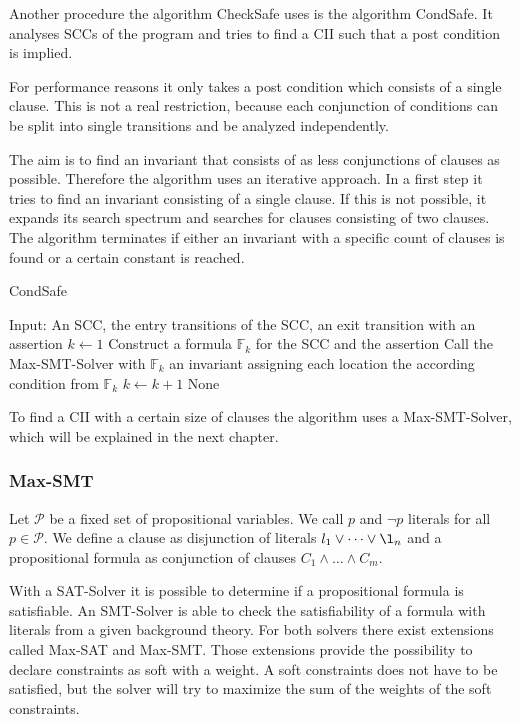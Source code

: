 Another procedure the algorithm CheckSafe uses is the algorithm CondSafe.
It analyses SCCs of the program and tries to find a CII such that a post condition is implied.

For performance reasons it only takes a post condition which consists of a single clause.
This is not a real restriction, because each conjunction of conditions can be split into single transitions and be analyzed independently.

The aim is to find an invariant that consists of as less conjunctions of clauses as possible.
Therefore the algorithm uses an iterative approach.
In a first step it tries to find an invariant consisting of a single clause.
If this is not possible, it expands its search spectrum and searches for clauses consisting of two clauses.
The algorithm terminates if either an invariant with a specific count of clauses is found or a certain constant is reached.

\begin{algorithm}
\caption{CondSafe}\label{condsafe}
\begin{algorithmic}[1]
\State Input: An SCC, the entry transitions of the SCC, an exit transition with an assertion
\State $k \gets 1$
\Repeat
  \State Construct a formula $\mathbb{F}_k$ for the SCC and the assertion
  \State Call the Max-SMT-Solver with $\mathbb{F}_k$
    \Return an invariant assigning each location the according condition from $\mathbb{F}_k$
  \EndIf
  \State $k \gets k + 1$
\Return None
\end{algorithmic}
\end{algorithm}

To find a CII with a certain size of clauses the algorithm uses a Max-SMT-Solver, which will be explained in the next chapter.

\subsubsection{Max-SMT}

Let $\mathcal{P}$ be a fixed set of propositional variables.
We call $p$ and $\neg p$ literals for all $p \in \mathcal{P}$.
We define a clause as disjunction of literals $l_1 \vee \dots \vee \l_n$ and a propositional formula as conjunction of clauses $C_1 \wedge \dots \wedge C_m$.

With a SAT-Solver it is possible to determine if a propositional formula is satisfiable.
An SMT-Solver is able to check the satisfiability of a formula with literals from a given background theory.
For both solvers there exist extensions called Max-SAT and Max-SMT.
Those extensions provide the possibility to declare constraints as soft with a weight.
A soft constraints does not have to be satisfied, but the solver will try to maximize the sum of the weights of the soft constraints.

